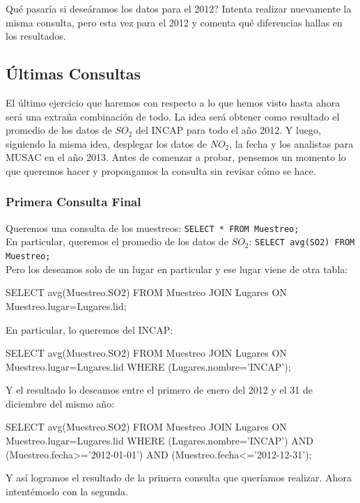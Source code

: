 \documentclass[10pt,letterpaper]{article}
\newcommand{\inlinecode}[1]{
\colorbox{light-gray}{\texttt{#1}}
}
\newenvironment{Code}
{
\begin{lrbox}{\selvestebox}%
\begin{minipage}{\dimexpr\columnwidth-2\fboxsep\relax}
\fontfamily{\ttdefault}\selectfont
}
{\end{minipage}\end{lrbox}%
\begin{center}
\colorbox{light-gray}{\usebox{\selvestebox}}
\end{center}
}
\begin{document}
Qu\'e pasar\'ia si dese\'aramos los datos para el 2012? Intenta realizar nuevamente la misma consulta, pero esta vez para el 2012 y comenta qu\'e diferencias hallas en los resultados.

\subsection{\'Ultimas Consultas}
El \'ultimo ejercicio que haremos con respecto a lo que hemos visto hasta ahora ser\'a una extra\~na combinaci\'on de todo. La idea ser\'a obtener como resultado el promedio de los datos de $SO_2$ del INCAP para todo el a\~no 2012. Y luego, siguiendo la misma idea, desplegar los datos de $NO_2$, la fecha y los analistas para MUSAC en el a\~no 2013. Antes de comenzar a probar, pensemos un momento lo que queremos hacer y propongamos la consulta sin revisar c\'omo se hace.\\

\subsubsection{Primera Consulta Final}

\noindent Queremos una consulta de los muestreos: \inlinecode{SELECT * FROM Muestreo;}\\
En particular, queremos el promedio de los datos de $SO_2$: \inlinecode{SELECT avg(SO2) FROM Muestreo;}\\
Pero los deseamos solo de un lugar en particular y ese lugar viene de otra tabla:
\begin{Code}
SELECT avg(Muestreo.SO2) FROM Muestreo JOIN Lugares ON Muestreo.lugar=Lugares.lid;
\end{Code}
En particular, lo queremos del INCAP:
\begin{Code}
SELECT avg(Muestreo.SO2) FROM Muestreo JOIN Lugares ON Muestreo.lugar=Lugares.lid WHERE (Lugares.nombre='INCAP');
\end{Code}
Y el resultado lo deseamos entre el primero de enero del 2012 y el 31 de diciembre del mismo a\~no:
\begin{Code}
SELECT avg(Muestreo.SO2) FROM Muestreo JOIN Lugares ON Muestreo.lugar=Lugares.lid WHERE (Lugares.nombre='INCAP') AND (Muestreo.fecha>='2012-01-01') AND (Muestreo.fecha<='2012-12-31');
\end{Code}

Y as\'i logramos el resultado de la primera consulta que quer\'iamos realizar. Ahora intent\'emoslo con la segunda.\\
\end{document}
